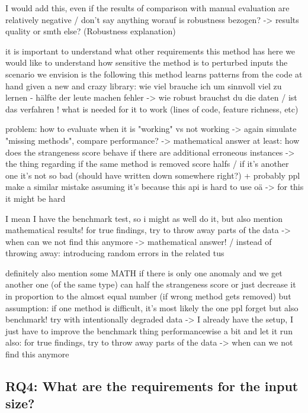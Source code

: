 I would add this, even if the results of comparison with manual evaluation are relatively negative / don't say anything
worauf is robustness bezogen? -> results quality or smth else? (Robustness explanation)

it is important to understand what other requirements this method has
here we would like to understand how sensitive the method is to perturbed inputs
the scenario we envision is the following
    this method learns patterns from the code at hand
    given a new and crazy library:
    wie viel brauche ich um sinnvoll viel zu lernen - hälfte der leute machen fehler -> wie robust brauchst du die daten / ist das verfahren !
    what is needed for it to work (lines of code, feature richness, etc) 

problem: how to evaluate when it is "working" vs not working -> again simulate "missing methods", compare performance?
-> mathematical answer at least: how does the strangeness score behave if there are additional erroneous instances
    -> the thing regarding if the same method is removed score halfs / if it's another one it's not so bad (should have written down somewhere right?)
    + probably ppl make a similar mistake assuming it's because this api is hard to use oä
    -> for this it might be hard

I mean I have the benchmark test, so i might as well do it, but also mention mathematical results!
for true findings, try to throw away parts of the data -> when can we not find this anymore -> mathematical answer!
/ instead of throwing away: introducing random errors in the related tus

definitely also mention some MATH
    if there is only one anomaly and we get another one (of the same type) can half the strangeness score
    or just decrease it in proportion to the almost equal number (if wrong method gets removed)
    but assumption: if one method is difficult, it's most likely the one ppl forget
but also benchmark!
try with intentionally degraded data -> I already have the setup, I just have to improve the benchmark thing performancewise a bit and let it run
also: for true findings, try to throw away parts of the data -> when can we not find this anymore

\subsection{RQ4: What are the requirements for the input size?}

